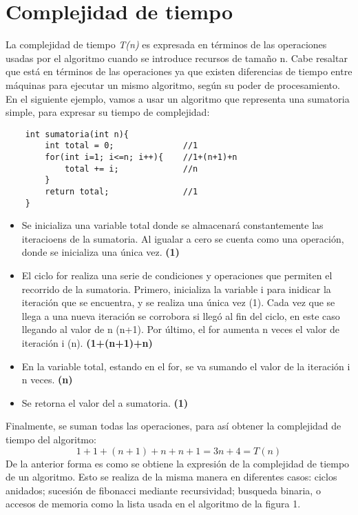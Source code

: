 \documentclass{article}
\begin{document}
\section{Complejidad de tiempo}
La complejidad de tiempo \textit{T(n)} es expresada en términos de las operaciones usadas por el algoritmo cuando se introduce recursos de tamaño n. Cabe resaltar que está en términos de las operaciones ya que existen diferencias de tiempo entre máquinas para ejecutar un mismo algoritmo, según su poder de procesamiento. 
\\
En el siguiente ejemplo, vamos a usar un algoritmo que representa una sumatoria simple, para expresar su tiempo de complejidad:
\begin{center}
    \begin{lstlisting}
    int sumatoria(int n){
        int total = 0;              //1
        for(int i=1; i<=n; i++){    //1+(n+1)+n
            total += i;             //n
        }
        return total;               //1
    }
    \end{lstlisting}
\end{center}
\begin{itemize}
    \item Se inicializa una variable total donde se almacenará constantemente las iteracioens de la sumatoria. Al igualar a cero se cuenta como una operación, donde se inicializa una única vez. \textbf{(1)} 
    \item El ciclo for realiza una serie de condiciones y operaciones que permiten el recorrido de la sumatoria. Primero, inicializa la variable i para inidicar la iteración que se encuentra, y se realiza una única vez (1). Cada vez que se llega a una nueva iteración se corrobora si llegó al fin del ciclo, en este caso llegando al valor de n (n+1). Por último, el for aumenta n veces el valor de iteración i (n). \textbf{(1+(n+1)+n)} 
    \item En la variable total, estando en el for, se va sumando el valor de la iteración i n veces. \textbf{(n)} 
    \item Se retorna el valor del a sumatoria. \textbf{(1)} 
\end{itemize}
Finalmente, se suman todas las operaciones, para así obtener la complejidad de tiempo del algoritmo: 
$$1+1+(n+1)+n+n+1=3n+4=T(n)$$
De la anterior forma es como se obtiene la expresión de la complejidad de tiempo de un algoritmo. Esto se realiza de la misma manera en diferentes casos: ciclos anidados; sucesión de fibonacci mediante recursividad; busqueda binaria, o accesos de memoria como la lista usada en el algoritmo de la figura 1. 
\end{document}
